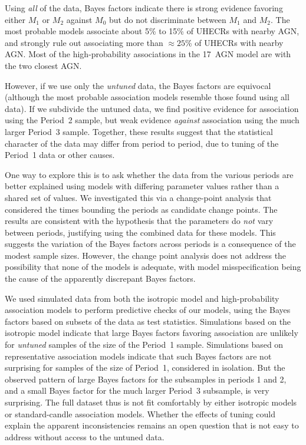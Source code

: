Using {\em all} of the data, Bayes factors indicate there is strong evidence
favoring either $M_1$ or $M_2$ against $M_0$ but do not discriminate between
$M_1$ and $M_2$.  The most probable models associate about 5\% to 15\% of
UHECRs with nearby AGN, and strongly rule out associating more than
$\approx 25$\% of UHECRs with nearby AGN.  Most of the high-probability
associations in the 17~AGN model are with the two closest AGN.

However, if we use only the {\em untuned} data, the Bayes factors are
equivocal (although the most probable association models resemble those
found using all data).  If we subdivide the untuned data, we find positive
evidence for association using the Period~2 sample, but weak evidence {\em
against} association using the much larger Period~3 sample.  Together, these
results suggest that the statistical character of the data may differ from
period to period, due to tuning of the Period~1 data or other causes.

One way to explore this is to ask whether the data from the various periods
are better explained using models with differing parameter values rather
than a shared set of values.  We investigated this via a change-point
analysis that considered the times bounding the periods as candidate change
points.  The results are consistent with the hypothesis that the parameters
do {\em not} vary between periods, justifying using the combined data for
these models.  This suggests the variation of the Bayes factors across
periods is a consequence of the modest sample sizes.  However, the
change point analysis does not address the possibility that none of the
models is adequate, with model misspecification being the cause of the
apparently discrepant Bayes factors.

We used simulated data from both the isotropic model and
high-probability association models to perform predictive checks of our
models, using the Bayes factors based on subsets of the data as test
statistics.  Simulations based on the isotropic model indicate that large
Bayes factors favoring association are unlikely for {\em untuned} samples of
the size of the Period~1 sample.  Simulations based on representative
association models indicate that such Bayes factors are not surprising
for samples of the size of Period~1, considered in isolation.  But
the observed pattern of large Bayes factors for the subsamples in
periods 1 and 2, and a small Bayes factor for the much larger Period~3
subsample, is very surprising.  The full dataset thus is not fit
comfortably by either isotropic models or standard-candle association
models.
Whether the effects of tuning could explain the apparent inconsistencies
remains an open question that is not easy to address without access to the
untuned data.

